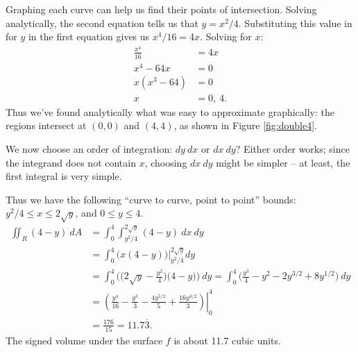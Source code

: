 {Graphing each curve can help us find their points of intersection. Solving analytically, the second equation tells us that $y=x^2/4$. Substituting this value in for $y$ in the first equation gives us $x^4/16 = 4x$. Solving for $x$:
\begin{align*}
\frac{x^4}{16} &= 4x\\
x^4-64x &=0\\
x(x^3-64) &=0\\
x&= 0,\ 4.
\end{align*}
Thus we've found analytically what was easy to approximate graphically: the regions intersect at $(0,0)$ and $(4,4)$, as shown in Figure \ref{fig:double4}. 

We now choose an order of integration: $dy\ dx$ or $dx\ dy$? Either order works; since the integrand does not contain $x$, choosing $dx\ dy$ might be simpler -- at least, the first integral is very simple.

Thus we have the following ``curve to curve, point to point'' bounds: $y^2/4\leq x\leq 2\sqrt y$, and $0\leq y\leq 4$. 
\begin{align*}
\iint_R (4-y)\ dA &= \int_0^4\int_{y^2/4}^{2\sqrt{y}}(4-y)\ dx\ dy\\
				&= \int_0^4 \big(x(4-y)\big)\Big|_{y^2/4}^{2\sqrt{y}} dy\\
				&= \int_0^4 \Big(\big(2\sqrt{y}-\frac{y^2}{4}\big)\big(4-y)\Big)\ dy = \int_0^4 \Big( \frac{y^3}{4}-y^2-2y^{3/2}+8y^{1/2}\Big)\ dy\\
				&= \left.\left(\frac{y^4}{16}-\frac{y^3}{3}-\frac{4y^{5/2}}5+\frac{16y^{3/2}}3\right)\right|_0^4\\
				&= \frac{176}{15} = 11.7\overline{3}.
\end{align*}
The signed volume under the surface $f$ is about 11.7 cubic units.
}\\

